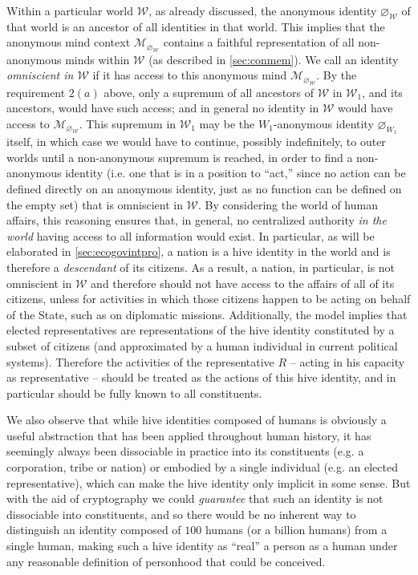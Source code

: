\documentclass[pra,twocolumn,groupedaddress,10pt]{revtex4}
\theoremstyle{definition}
\begin{document}
Within a particular world $\mathcal{W}$, as already discussed, the anonymous identity $\varnothing_\mathcal{W}$ of that world is an ancestor of all identities in that world. This implies that the anonymous mind context ${\mathcal{M}}_{\varnothing_{\mathcal{W}}}$ contains a faithful representation of all non-anonymous minds within $\mathcal{W}$ (as described in \autoref{sec:conmem}). We call an identity \emph{omniscient in $\mathcal{W}$} if it has access to this anonymous mind ${\mathcal{M}}_{\varnothing_{\mathcal{W}}}$. By the requirement $2(a)$ above, only a supremum of all ancestors of $\mathcal{W}$ in $\mathcal{W}_1$, and its ancestors, would have such access; and in general no identity in $\mathcal{W}$ would have access to ${\mathcal{M}}_{\varnothing_{\mathcal{W}}}$. This supremum in $\mathcal{W}_1$ may be the $W_1$-anonymous identity $\varnothing_{W_1}$ itself, in which case we would have to continue, possibly indefinitely, to outer worlds until a non-anonymous supremum is reached, in order to find a non-anonymous identity (i.e. one that is in a position to ``act,'' since no action can be defined directly on an anonymous identity, just as no function can be defined on the empty set) that is omniscient in $\mathcal{W}$. By considering the world of human affairs, this reasoning ensures that, in general, no centralized authority \textit{in the world} having access to all information would exist. In particular, as will be elaborated in \autoref{sec:ecogovintpro}, a nation is a hive identity in the world and is therefore a \textit{descendant} of its citizens. As a result, a nation, in particular, is not omniscient in $\mathcal{W}$ and therefore should not have access to the affairs of all of its citizens, unless for activities in which those citizens happen to be acting on behalf of the State, such as on diplomatic missions. Additionally, the model implies that elected representatives are representations of the hive identity constituted by a subset of citizens (and approximated by a human individual in current political systems). Therefore the activities of the representative $R$ -- acting in his capacity as representative -- should be treated as the actions of this hive identity, and in particular should be fully known to all constituents.

We also observe that while hive identities composed of humans is obviously a useful abstraction that has been applied throughout human history, it has seemingly always been dissociable in practice into its constituents (e.g. a corporation, tribe or nation) or embodied by a single individual (e.g. an elected representative), which can make the hive identity only implicit in some sense. But with the aid of cryptography we could \textit{guarantee} that such an identity is not dissociable into constituents, and so there would be no inherent way to distinguish an identity composed of $100$ humans (or a billion humans) from a single human, making such a hive identity as ``real'' a person as a human under any reasonable definition of personhood that could be conceived.
\end{document}
